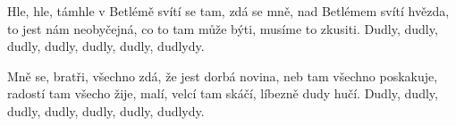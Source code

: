 \vskip-5mm
\IncludeLilypond

Hle, hle, támhle v Betlémě svítí se tam, zdá se mně, 
nad Betlémem svítí hvězda, to jest nám neobyčejná,
co to tam může býti, musíme to zkusiti.
Dudly, dudly, dudly, dudly,
dudly, dudly, dudlydy.

Mně se, bratři, všechno zdá, že jest dorbá novina,
neb tam všechno poskakuje, radostí tam všecho žije,
malí, velcí tam skáčí, líbezně dudy hučí.
Dudly, dudly, dudly, dudly,
dudly, dudly, dudlydy.
